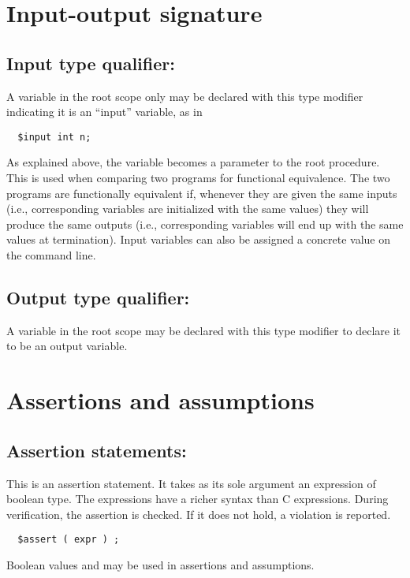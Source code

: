 \section{Input-output signature}

\subsection{Input type qualifier: \cinput} A variable in the root scope only may be declared
with this type modifier indicating it is an ``input'' variable, as in
\begin{verbatim}
  $input int n;
\end{verbatim}
As explained above, the variable becomes a parameter to the root
procedure.  This is used when comparing two programs for functional
equivalence.  The two programs are functionally equivalent if,
whenever they are given the same inputs (i.e., corresponding \cinput{}
variables are initialized with the same values) they will produce the
same outputs (i.e., corresponding \coutput{} variables will end up
with the same values at termination).  Input variables can also be
assigned a concrete value on the command line.

\subsection{Output type qualifier: \coutput}

A variable in the root scope may be declared with this type modifier
to declare it to be an output variable.

\section{Assertions and assumptions}

\subsection{Assertion statements: \cassert}

This is an assertion statement.  It takes as its
sole argument an expression of boolean type.  The expressions have a
richer syntax than C expressions.  During verification, the assertion
is checked.  If it does not hold, a violation is reported.
\begin{verbatim}
  $assert ( expr ) ;
\end{verbatim}
Boolean values \ctrue{} and \cfalse{} may be used in assertions
and assumptions.

